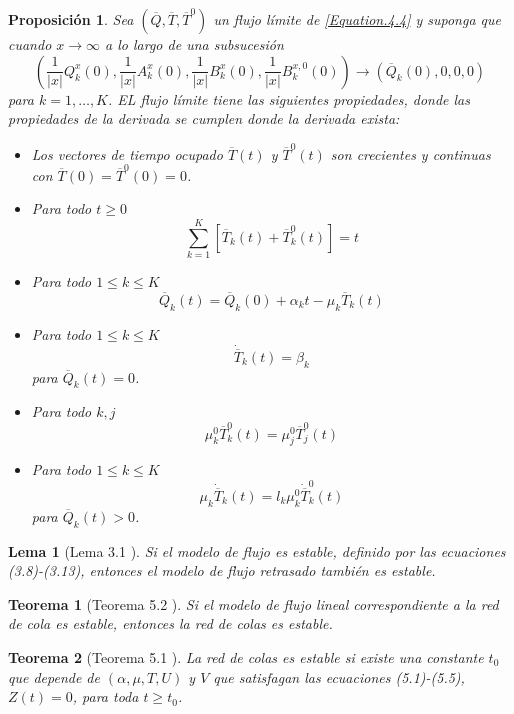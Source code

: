 \documentclass{article}
\newtheorem{Teo}{Teorema}
\newtheorem{Prop}{Proposición}
\newtheorem{Lema}{Lema}
\begin{document}
\begin{Prop}
 Sea $\left(\overline{Q},\overline{T},\overline{T}^{0}\right)$ un flujo l\'imite de \ref{Equation.4.4} y suponga que cuando $x\rightarrow\infty$ a lo largo de
una subsucesi\'on \[\left(\frac{1}{|x|}Q_{k}^{x}\left(0\right),\frac{1}{|x|}A_{k}^{x}\left(0\right),\frac{1}{|x|}B_{k}^{x}\left(0\right),\frac{1}{|x|}B_{k}^{x,0}\left(0\right)\right)\rightarrow\left(\overline{Q}_{k}\left(0\right),0,0,0\right)\] para $k=1,\ldots,K$. EL flujo l\'imite tiene las siguientes propiedades, donde las propiedades de la derivada se cumplen donde la derivada exista:
\begin{itemize}
 \item[i)] Los vectores de tiempo ocupado $\overline{T}\left(t\right)$ y $\overline{T}^{0}\left(t\right)$ son crecientes y continuas con $\overline{T}\left(0\right)=\overline{T}^{0}\left(0\right)=0$.
\item[ii)] Para todo $t\geq0$ \[\sum_{k=1}^{K}\left[\overline{T}_{k}\left(t\right)+\overline{T}_{k}^{0}\left(t\right)\right]=t\]
\item[iii)] Para todo $1\leq k\leq K$ \[\overline{Q}_{k}\left(t\right)=\overline{Q}_{k}\left(0\right)+\alpha_{k}t-\mu_{k}\overline{T}_{k}\left(t\right)\]
\item[iv)]  Para todo $1\leq k\leq K$ \[\dot{{\overline{T}}}_{k}\left(t\right)=\beta_{k}\] para $\overline{Q}_{k}\left(t\right)=0$.
\item[v)] Para todo $k,j$ \[\mu_{k}^{0}\overline{T}_{k}^{0}\left(t\right)=\mu_{j}^{0}\overline{T}_{j}^{0}\left(t\right)\]
\item[vi)]  Para todo $1\leq k\leq K$ \[\mu_{k}\dot{{\overline{T}}}_{k}\left(t\right)=l_{k}\mu_{k}^{0}\dot{{\overline{T}}}_{k}^{0}\left(t\right)\] para $\overline{Q}_{k}\left(t\right)>0$.
\end{itemize}
\end{Prop}

\begin{Lema}[Lema 3.1 \cite{Chen}]\label{Lema3.1}
Si el modelo de flujo es estable, definido por las ecuaciones (3.8)-(3.13), entonces el modelo de flujo retrasado tambi\'en es estable.
\end{Lema}

\begin{Teo}[Teorema 5.2 \cite{Chen}]\label{Tma.5.2}
Si el modelo de flujo lineal correspondiente a la red de cola es estable, entonces la red de colas es estable.
\end{Teo}

\begin{Teo}[Teorema 5.1 \cite{Chen}]\label{Tma.5.1.Chen}
La red de colas es estable si existe una constante $t_{0}$ que depende de $\left(\alpha,\mu,T,U\right)$ y $V$ que satisfagan las ecuaciones (5.1)-(5.5), $Z\left(t\right)=0$, para toda $t\geq t_{0}$.
\end{Teo}
\end{document}
